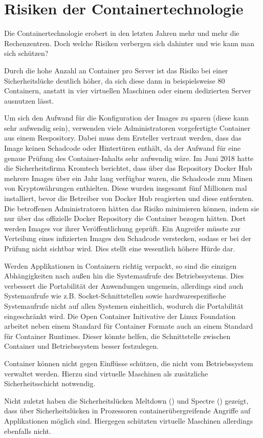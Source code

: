\section{Risiken der Containertechnologie}
\label{sec:Risiken der Containertechnologie}
Die Containertechnologie erobert in den letzten Jahren mehr und mehr die Rechenzentren. Doch welche Risiken verbergen sich dahinter und wie kann man sich schützen?

Durch die hohe Anzahl an Container pro Server ist das Risiko bei einer Sicherheitslücke deutlich höher, da sich diese dann in beispielsweise 80 Containern, anstatt in vier virtuellen Maschinen oder einem dedizierten Server ausnutzen lässt.\cite{Risiken}

Um sich den Aufwand für die Konfiguration der Images zu sparen (diese kann sehr aufwendig sein), verwenden viele Administratoren vorgefertigte Container aus einem Respository.
Dabei muss dem Ersteller vertraut werden, dass das Image keinen Schadcode oder Hintertüren enthält, da der Aufwand für eine genaue Prüfung des Container-Inhalts sehr aufwendig wäre.
Im Juni 2018 hatte die Sicherheitsfirma Kromtech berichtet, dass über das Repository Docker Hub mehrere Images über ein Jahr lang verfügbar waren, die Schadcode zum Minen von Kryptowährungen enthielten.
Diese wurden insgesamt fünf Millionen mal installiert, bevor die Betreiber von Docker Hub reagierten und diese entfernten.
\cite{kromtech}
Die betroffenen Administratoren hätten das Risiko minimieren können, indem sie nur über das offizielle Docker Repository die Container bezogen hätten.
Dort werden Images vor ihrer Veröffentlichung geprüft.
\cite{DockerHubOfficial}
Ein Angreifer müsste zur Verteilung eines infizierten Images den Schadcode verstecken, sodass er bei der Prüfung nicht sichtbar wird. Dies stellt eine wesentlich höhere Hürde dar.

Werden Applikationen in Containern richtig verpackt, so sind die einzigen Abhängigkeiten nach außen hin die Systemaufrufe des Betriebssystems.
Dies verbessert die Portabilität der Anwendungen ungemein, allerdings sind auch Systemaufrufe wie z.B. Socket-Schnittstellen sowie hardwarespezifische Systemaufrufe nicht auf allen Systemen einheitlich, wodurch die Portabilität eingeschränkt wird.
Die Open Container Initivative der Linux Foundation arbeitet neben einem Standard für Container Formate auch an einem Standard für Container Runtimes.
Dieser könnte helfen, die Schnittstelle zwischen Container und Betriebssystem besser festzulegen.

Container können nicht gegen Einflüsse schützen, die nicht vom Betriebssystem verwaltet werden. Hierzu sind virtuelle Maschinen als zusätzliche Sicherheitsschicht notwendig.\cite{11517836120160501}

Nicht zuletzt haben die Sicherheitslücken Meltdown (\cite{DBLP:journals/corr/abs-1801-01207}) und Spectre (\cite{DBLP:journals/corr/abs-1801-01203}) gezeigt, dass über Sicherheitslücken in Prozessoren containerübergreifende Angriffe auf Applikationen möglich sind. Hiergegen schützten virtuelle Maschinen allerdings ebenfalls nicht.  
